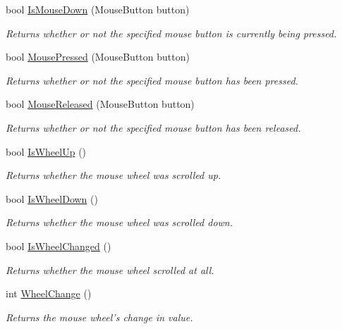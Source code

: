 \begin{DoxyCompactItemize}
bool \hyperlink{class_tri_devs_1_1_tri_engine_1_1_input_1_1_null_input_manager_ad2340ded691e74f38fef2cd7269ba635}{Is\-Mouse\-Down} (Mouse\-Button button)
\begin{DoxyCompactList}\small\item\em Returns whether or not the specified mouse button is currently being pressed. \end{DoxyCompactList}\item 
bool \hyperlink{class_tri_devs_1_1_tri_engine_1_1_input_1_1_null_input_manager_ad942524db4d021fa0797dd23214adf0d}{Mouse\-Pressed} (Mouse\-Button button)
\begin{DoxyCompactList}\small\item\em Returns whether or not the specified mouse button has been pressed. \end{DoxyCompactList}\item 
bool \hyperlink{class_tri_devs_1_1_tri_engine_1_1_input_1_1_null_input_manager_ad01d19f722b8671d78d3d0843aa4395e}{Mouse\-Released} (Mouse\-Button button)
\begin{DoxyCompactList}\small\item\em Returns whether or not the specified mouse button has been released. \end{DoxyCompactList}\item 
bool \hyperlink{class_tri_devs_1_1_tri_engine_1_1_input_1_1_null_input_manager_a9a2249af7dc87120f5bf3b3253cad965}{Is\-Wheel\-Up} ()
\begin{DoxyCompactList}\small\item\em Returns whether the mouse wheel was scrolled up. \end{DoxyCompactList}\item 
bool \hyperlink{class_tri_devs_1_1_tri_engine_1_1_input_1_1_null_input_manager_a86e002c975b4f59a63fbf8c85fd7db49}{Is\-Wheel\-Down} ()
\begin{DoxyCompactList}\small\item\em Returns whether the mouse wheel was scrolled down. \end{DoxyCompactList}\item 
bool \hyperlink{class_tri_devs_1_1_tri_engine_1_1_input_1_1_null_input_manager_a62e5d30b2a9e3da9596345748aee27ac}{Is\-Wheel\-Changed} ()
\begin{DoxyCompactList}\small\item\em Returns whether the mouse wheel scrolled at all. \end{DoxyCompactList}\item 
int \hyperlink{class_tri_devs_1_1_tri_engine_1_1_input_1_1_null_input_manager_a3e9e2fd7a4ae4dbc50d12e4650cbf57e}{Wheel\-Change} ()
\begin{DoxyCompactList}\small\item\em Returns the mouse wheel's change in value. \end{DoxyCompactList}\end{DoxyCompactItemize}
